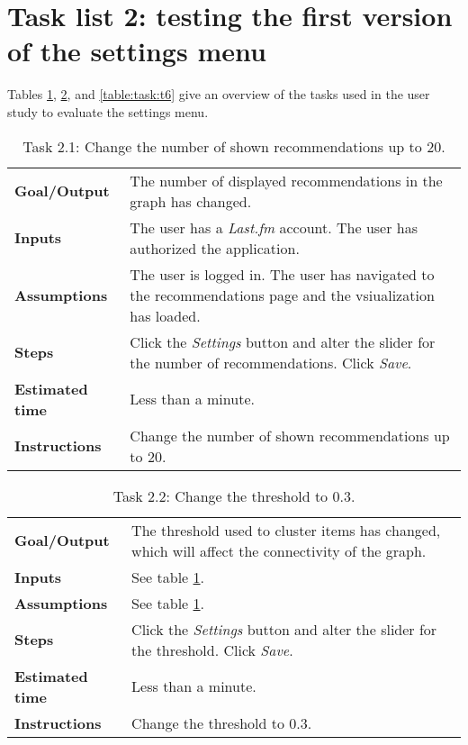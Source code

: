 \section{Task list 2: testing the first version of the settings menu}\label{appendix:tasklists:prototype2}

Tables \ref{table:task:t4}, \ref{table:task:t5}, and \ref{table:task:t6} give an overview of the tasks used in the user study to evaluate the settings menu.

\begin{table}
	\caption{Task 2.1: Change the number of shown recommendations up to $20$.}
	\begin{tabular}{ p{80px} | p{350px} }
		\hline
		\textbf{Goal/Output}			& The number of displayed recommendations in the graph has changed. \\
		\textbf{Inputs}						& The user has a \emph{Last.fm} account. The user has authorized the application. \\
		\textbf{Assumptions}			& The user is logged in. The user has navigated to the recommendations page and the vsiualization has loaded. \\
		\textbf{Steps}						& Click the \emph{Settings} button and alter the slider for the number of recommendations. Click \emph{Save}. \\
		\textbf{Estimated time} 	& Less than a minute. \\
		\textbf{Instructions}			& Change the number of shown recommendations up to $20$. \\
		\hline
	\end{tabular}
	\label{table:task:t4}
\end{table}


\begin{table}
	\caption{Task 2.2: Change the threshold to $0.3$.}
	\begin{tabular}{ p{80px} | p{350px} }
		\hline
		\textbf{Goal/Output}			& The threshold used to cluster items has changed, which will affect the connectivity of the graph. \\
		\textbf{Inputs}						& See table \ref{table:task:t4}. \\
		\textbf{Assumptions}			& See table \ref{table:task:t4}. \\
		\textbf{Steps}						& Click the \emph{Settings} button and alter the slider for the threshold. Click \emph{Save}. \\
		\textbf{Estimated time} 	& Less than a minute. \\
		\textbf{Instructions}			& Change the threshold to $0.3$. \\
		\hline
	\end{tabular}
	\label{table:task:t5}
\end{table}



